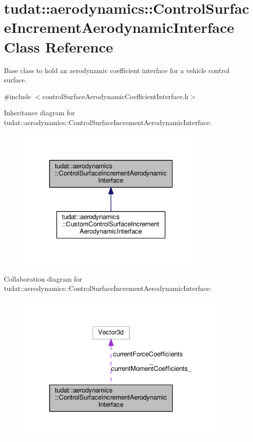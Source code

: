 \hypertarget{classtudat_1_1aerodynamics_1_1ControlSurfaceIncrementAerodynamicInterface}{}\section{tudat\+:\+:aerodynamics\+:\+:Control\+Surface\+Increment\+Aerodynamic\+Interface Class Reference}
\label{classtudat_1_1aerodynamics_1_1ControlSurfaceIncrementAerodynamicInterface}


Base class to hold an aerodynamic coefficient interface for a vehicle control surface.  




{\ttfamily \#include $<$control\+Surface\+Aerodynamic\+Coefficient\+Interface.\+h$>$}



Inheritance diagram for tudat\+:\+:aerodynamics\+:\+:Control\+Surface\+Increment\+Aerodynamic\+Interface\+:
\nopagebreak
\begin{figure}[H]
\begin{center}
\leavevmode
\includegraphics[width=268pt]{classtudat_1_1aerodynamics_1_1ControlSurfaceIncrementAerodynamicInterface__inherit__graph}
\end{center}
\end{figure}


Collaboration diagram for tudat\+:\+:aerodynamics\+:\+:Control\+Surface\+Increment\+Aerodynamic\+Interface\+:
\nopagebreak
\begin{figure}[H]
\begin{center}
\leavevmode
\includegraphics[width=298pt]{classtudat_1_1aerodynamics_1_1ControlSurfaceIncrementAerodynamicInterface__coll__graph}
\end{center}
\end{figure}
